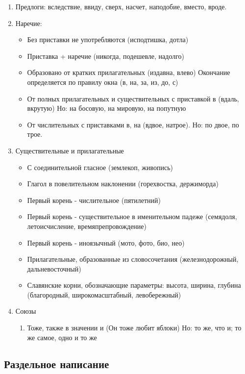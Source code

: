 \documentclass{article}
\begin{document}
\begin{enumerate}
\item
  Предлоги: вследствие, ввиду, сверх, насчет, наподобие, вместо, вроде.
\item
  Наречие:
  \begin{itemize}
  \item
    Без приставки не употребляются (исподтишка, дотла)
  \item
    Приставка + наречие (никогда, подешевле, надолго)
  \item
    Образовано от кратких прилагательных (издавна, влево)
    Окончание определяется по правилу окна (в, на, за, из, до, с)
  \item
    От полных прилагательных и существительных с приставкой в (вдаль, вкрутую)
    Но: на босовую, на мировую, на попутную
  \item
    От числительных с приставками в, на (вдвое, натрое).
    Но: по двое, по трое.
  \end{itemize}
\item
  Существительные и прилагательные
  \begin{itemize}
  \item
    С соединительной гласное (землекоп, живопись)
  \item
    Глагол в повелительном наклонении (горехвостка, держиморда)
  \item
    Первый корень - числительное (пятилетний)
  \item
    Первый корень - существительное в именительном падеже (семядоля, летоисчисление, времяпрепровождение)
  \item
    Первый корень - иноязычный (мото, фото, био, нео)
  \item
    Прилагательные, образованные из словосочетания (железнодорожный, дальневосточный)
  \item
    Славянские корни, обозначающие параметры: высота, ширина, глубина (благородный, широкомасштабный, левобережный)
  \end{itemize}
\item
  Союзы
  \begin{enumerate}
  \item
    Тоже, также в значении и (Он тоже любит яблоки)
    Но: то же, что и; то же самое, одно и то же
  \end{enumerate}
\end{enumerate}

\subsection{Раздельное написание}
\end{document}
